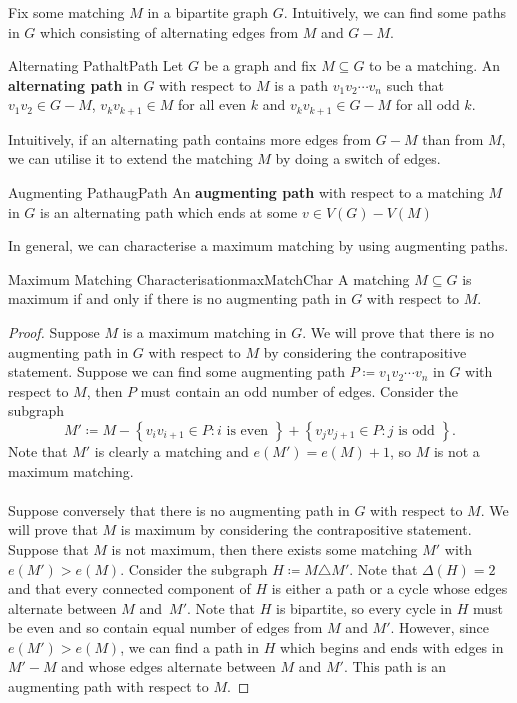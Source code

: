 \documentclass[math]{amznotes}
\theoremstyle{remark}
\newcommand{\0}{\mathbf{0}}
\newcommand{\1}{\mathbf{1}}
\begin{document}
Fix some matching $M$ in a bipartite graph $G$. Intuitively, we can find some paths in $G$ which consisting of alternating edges from $M$ and $G - M$.
\begin{dfnbox}{Alternating Path}{altPath}
    Let $G$ be a graph and fix $M \subseteq G$ to be a matching. An {\color{red} \textbf{alternating path}} in $G$ with respect to $M$ is a path $v_1v_2\cdots v_n$ such that $v_1v_2 \in G - M$, $v_kv_{k + 1} \in M$ for all even $k$ and $v_kv_{k + 1} \in G - M$ for all odd $k$.
\end{dfnbox}
Intuitively, if an alternating path contains more edges from $G - M$ than from $M$, we can utilise it to extend the matching $M$ by doing a switch of edges.
\begin{dfnbox}{Augmenting Path}{augPath}
    An {\color{red} \textbf{augmenting path}} with respect to a matching $M$ in $G$ is an alternating path which ends at some $v \in V(G) - V(M)$
\end{dfnbox}
In general, we can characterise a maximum matching by using augmenting paths.
\begin{thmbox}{Maximum Matching Characterisation}{maxMatchChar}
    A matching $M \subseteq G$ is maximum if and only if there is no augmenting path in $G$ with respect to $M$.
    \tcblower
    \begin{proof}
        Suppose $M$ is a maximum matching in $G$. We will prove that there is no augmenting path in $G$ with respect to $M$ by considering the contrapositive statement. Suppose we can find some augmenting path $P \coloneqq v_1v_2\cdots v_n$ in $G$ with respect to $M$, then $P$ must contain an odd number of edges. Consider the subgraph
        \begin{equation*}
            M' \coloneqq M - \left\{v_iv_{i + 1} \in P \colon i \textrm{ is even }\right\} + \left\{v_jv_{j + 1} \in P 
            \colon j \textrm{ is odd }\right\}.
        \end{equation*}
        Note that $M'$ is clearly a matching and $e(M') = e(M) + 1$, so $M$ is not a maximum matching.
        \\\\
        Suppose conversely that there is no augmenting path in $G$ with respect to $M$. We will prove that $M$ is maximum by considering the contrapositive statement. Suppose that $M$ is not maximum, then there exists some matching $M'$ with $e(M') > e(M)$. Consider the subgraph $H \coloneqq M \triangle M'$. Note that $\Delta(H) = 2$ and that every connected component of $H$ is either a path or a cycle whose edges alternate between $M$ and~$M'$. Note that $H$ is bipartite, so every cycle in $H$ must be even and so contain equal number of edges from $M$ and $M'$. However, since $e(M') > e(M)$, we can find a path in $H$ which begins and ends with edges in $M' - M$ and whose edges alternate between $M$ and $M'$. This path is an augmenting path with respect to $M$.
    \end{proof}
\end{thmbox}
\end{document}
